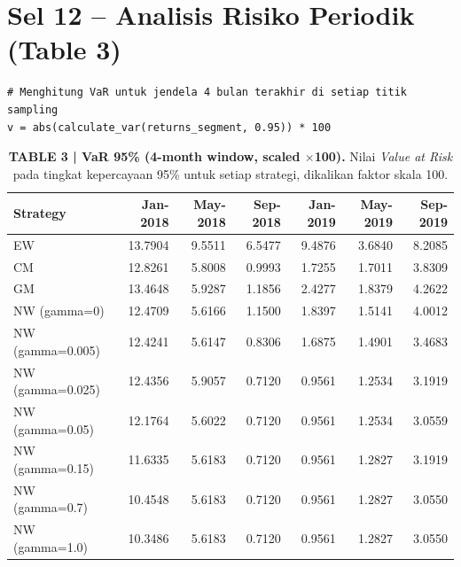 \documentclass[12pt,a4paper]{article}
\begin{document}
\section{Sel 12 -- Analisis Risiko Periodik (Table 3)}

\begin{lstlisting}[caption={Kalkulasi VaR 95\% Periodik}]
# Menghitung VaR untuk jendela 4 bulan terakhir di setiap titik sampling
v = abs(calculate_var(returns_segment, 0.95)) * 100
\end{lstlisting}

\begin{table}[h!]
    \centering
    \footnotesize
    \setlength{\tabcolsep}{4pt}
    \caption{\textbf{TABLE 3 | VaR 95\% (4-month window, scaled $\times$100).} Nilai \textit{Value at Risk} pada tingkat kepercayaan 95\% untuk setiap strategi, dikalikan faktor skala 100.}
    \begin{tabular}{lrrrrrr}
        \toprule
        \textbf{Strategy} & \textbf{Jan-2018} & \textbf{May-2018} & \textbf{Sep-2018} & \textbf{Jan-2019} & \textbf{May-2019} & \textbf{Sep-2019} \\
        \midrule
        EW                          & 13.7904 & 9.5511 & 6.5477 & 9.4876 & 3.6840 & 8.2085 \\
        CM                          & 12.8261 & 5.8008 & 0.9993 & 1.7255 & 1.7011 & 3.8309 \\
        GM                          & 13.4648 & 5.9287 & 1.1856 & 2.4277 & 1.8379 & 4.2622 \\
        NW (gamma=0)                & 12.4709 & 5.6166 & 1.1500 & 1.8397 & 1.5141 & 4.0012 \\
        NW (gamma=0.005)            & 12.4241 & 5.6147 & 0.8306 & 1.6875 & 1.4901 & 3.4683 \\
        NW (gamma=0.025)            & 12.4356 & 5.9057 & 0.7120 & 0.9561 & 1.2534 & 3.1919 \\
        NW (gamma=0.05)             & 12.1764 & 5.6022 & 0.7120 & 0.9561 & 1.2534 & 3.0559 \\
        NW (gamma=0.15)             & 11.6335 & 5.6183 & 0.7120 & 0.9561 & 1.2827 & 3.1919 \\
        NW (gamma=0.7)              & 10.4548 & 5.6183 & 0.7120 & 0.9561 & 1.2827 & 3.0550 \\
        NW (gamma=1.0)              & 10.3486 & 5.6183 & 0.7120 & 0.9561 & 1.2827 & 3.0550 \\

\end{tabular}
\end{table}
\end{document}
